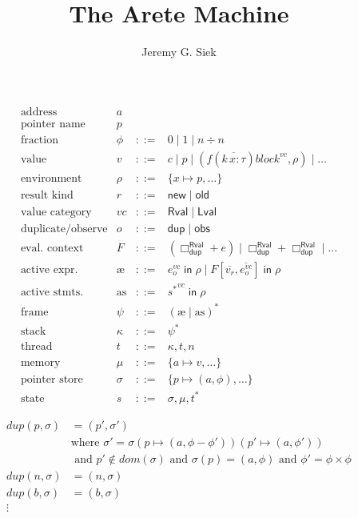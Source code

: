\documentclass{article}
\title{The Arete Machine}
\author{Jeremy G. Siek}
\newcommand{\IN}{\mathop{\mathsf{in}}}
\newcommand{\RVAL}{\mathsf{Rval}}
\newcommand{\LVAL}{\mathsf{Lval}}
\newcommand{\DUP}{\mathsf{dup}}
\newcommand{\OBS}{\mathsf{obs}}
\newcommand{\INCTX}[4]{\boxed{#1}^{#2}_{#3} \IN #4}
\newcommand{\act}{\text{\ae}}
\newcommand{\acts}{\mathrm{a}\!\mathrm{s}}
\begin{document}
\maketitle

\[
\begin{array}{lrcl}
  \text{address} & a \\
  \text{pointer name} & p \\
  \text{fraction} & \phi & ::= & 0 \mid 1 \mid n \div n \\
  \text{value}& v & ::= & c \mid p \mid
     (f(\overline{k\, x : \tau}) \mathit{block}^{\mathit{vc}}, \rho) \mid \ldots \\
  \text{environment} & \rho & ::= & \{ x \mapsto p, \ldots \} \\
  \text{result kind} & r & ::= & \mathsf{new} \mid \mathsf{old} \\
  \text{value category} & \mathit{vc} & ::= & \RVAL \mid \LVAL \\
  \text{duplicate/observe} & o & ::= & \DUP \mid \OBS \\
  \text{eval. context} & F & ::= & (\Box^\RVAL_\DUP + e) \mid \Box^\RVAL_\DUP + \Box^\RVAL_\DUP \mid ... \\
  \text{active expr.}& \act & ::= & \INCTX{e}{\mathit{vc}}{o}{\rho} \mid F[\overline{v_r},\overline{e^\mathit{vc}_o}] \IN \rho \\
  \text{active stmts.}& \acts & ::= & \INCTX{s^{*}}{\mathit{vc}}{}{\rho} \\
  \text{frame}& \psi & ::= & (\act \mid \acts)^{*} \\
  \text{stack}& \kappa & ::= & \psi^{*} \\
  \text{thread}& t & ::= & \kappa, t, n \\
  \text{memory}& \mu & ::= & \{ a \mapsto v, \ldots \} \\
  \text{pointer store} & \sigma & ::= & \{ p \mapsto (a, \phi), \ldots \} \\
  \text{state}& s & ::= & \sigma, \mu, t^{*}
\end{array}
\]

\begin{align*}
  \mathit{dup}(p,\sigma) &= (p', \sigma') \\
  & \text{where } \sigma' = \sigma(p \mapsto (a,\phi - \phi'))(p'\mapsto (a,\phi')) \\
    & \text{ and } p' \notin \mathit{dom}(\sigma) \text{ and }
         \sigma(p) = (a,\phi) \text{ and } \phi' = \phi \times \phi \\
  \mathit{dup}(n,\sigma) &= (n,\sigma) \\
  \mathit{dup}(b,\sigma) &= (b,\sigma) \\
   \vdots
\end{align*}
\end{document}
